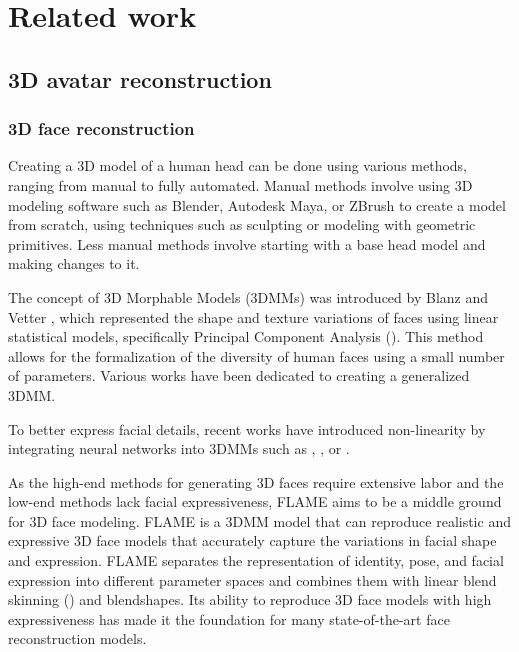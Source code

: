 \section{Related work}
\label{sec:related-work}

\subsection{3D avatar reconstruction}

\subsubsection{3D face reconstruction}

Creating a 3D model of a human head can be done using various methods, ranging from manual to fully automated. Manual methods involve using 3D modeling software such as Blender, Autodesk Maya, or ZBrush to create a model from scratch, using techniques such as sculpting or modeling with geometric primitives. Less manual methods involve starting with a base head model and making changes to it.

The concept of 3D Morphable Models (3DMMs) was introduced by Blanz and Vetter \cite{blanzMorphableModelSynthesis1999}, which represented the shape and texture variations of faces using linear statistical models, specifically Principal Component Analysis (). This method allows for the formalization of the diversity of human faces using a small number of parameters. Various works \cite{paysan3DFaceModel2009,gerigMorphableFaceModels2018,caoFaceWarehouse3DFacial2014,liLearningModelFacial2017,yangFaceScapeLargeScaleHigh2020} have been dedicated to creating a generalized 3DMM.

To better express facial details, recent works have introduced non-linearity by integrating neural networks into 3DMMs such as  \cite{ranjanGenerating3DFaces2018},  \cite{gecerFastGANFITGenerativeAdversarial2022}, or  \cite{galanakis3DMMRFConvolutionalRadiance2023,hongHeadNeRFRealTimeNeRFBased2022}.


As the high-end methods for generating 3D faces require extensive labor and the low-end methods lack facial expressiveness, FLAME \cite{liLearningModelFacial2017} aims to be a middle ground for 3D face modeling. FLAME is a 3DMM model that can reproduce realistic and expressive 3D face models that accurately capture the variations in facial shape and expression. FLAME separates the representation of identity, pose, and facial expression into different parameter spaces and combines them with linear blend skinning () and blendshapes. Its ability to reproduce 3D face models with high expressiveness has made it the foundation for many state-of-the-art face reconstruction models.

